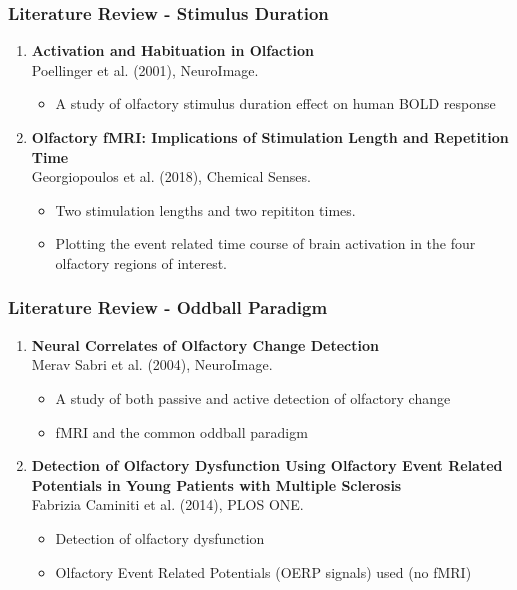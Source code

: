 \documentclass{beamer}
\newcounter{saveenumi}
\newcommand{\seti}{\setcounter{saveenumi}{\value{enumi}}}
\newcommand{\conti}{\setcounter{enumi}{\value{saveenumi}}}
\begin{document}
\begin{frame}
\frametitle{Literature Review - Stimulus Duration}

\begin{enumerate}
	\item \textrm{\textbf{Activation and Habituation in Olfaction}}
	\\
	Poellinger et al. (2001), NeuroImage.\\
	\begin{itemize}
		\item
		A study of olfactory stimulus duration effect on human BOLD response
	\end{itemize}

	\item  \textrm{\textbf{Olfactory fMRI: Implications of Stimulation Length and Repetition Time}}\\
	Georgiopoulos et al. (2018), Chemical Senses.\\
	
	\begin{itemize}
		\item
		Two stimulation lengths and two repititon times.
		\item
		Plotting the event related time course of brain activation in the four olfactory regions of interest. 
	\end{itemize}
	\seti
\end{enumerate}
	
\end{frame}

\begin{frame}
\frametitle{Literature Review - Oddball Paradigm}
\begin{enumerate}
	\conti
	\item \textrm{\textbf{Neural Correlates of Olfactory Change Detection}}
	\\
	Merav Sabri et al. (2004), NeuroImage.
	\begin{itemize}
		\item
		A study of both passive and active detection of olfactory change
		\item
		fMRI and the common oddball paradigm
	\end{itemize}
	\item \textrm{\textbf{Detection of Olfactory Dysfunction Using Olfactory Event
			Related Potentials in Young Patients with Multiple
			Sclerosis}}
	\\
	Fabrizia Caminiti et al. (2014), PLOS ONE.
	\begin{itemize}
		\item
		Detection of olfactory dysfunction 
		\item
		Olfactory Event Related Potentials (OERP signals) used (no fMRI)
	\end{itemize}
	\seti
\end{enumerate}
\end{frame}
\end{document}
